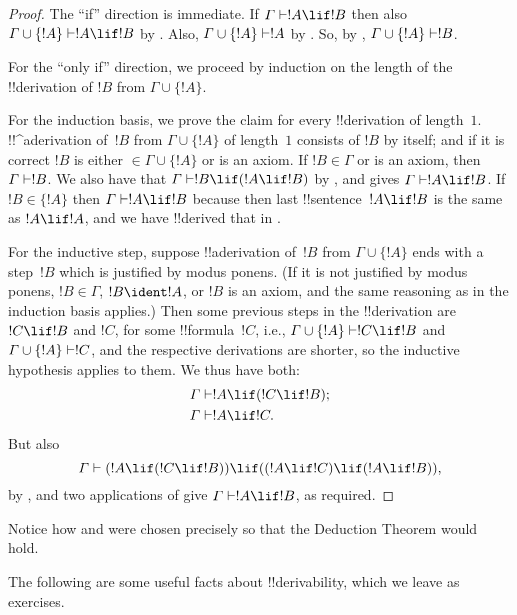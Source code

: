 \documentclass[../../../include/open-logic-section]{subfiles}
\begin{document}
\begin{proof}
The ``if'' direction is immediate.  If $\Gamma \Proves !A \lif !B$
then also $\Gamma \cup \{!A\} \Proves !A \lif !B$ by
.  Also, $\Gamma \cup \{!A\} \Proves !A$ by
. So, by , $\Gamma \cup
\{!A\} \Proves !B$.

For the ``only if'' direction, we proceed by induction on the length
of the !!{derivation} of $!B$ from $\Gamma \cup \{!A\}$.

For the induction basis, we prove the claim for every !!{derivation}
of length~$1$. !!^a{derivation} of~$!B$ from $\Gamma \cup \{!A\}$ of
length~$1$ consists of $!B$ by itself; and if it is correct $!B$ is
either $\in \Gamma \cup \{!A\}$ or is an axiom.  If $!B \in \Gamma$ or
is an axiom, then $\Gamma \Proves !B$. We also have that $\Gamma
\Proves !B \lif (!A \lif !B)$ by , and
 gives $\Gamma \Proves !A \lif !B$. If $!B \in \{ !A\}$
then $\Gamma \Proves !A \lif !B$ because then last !!{sentence}~$!A
\lif !B$ is the same as $!A \lif !A$, and we have !!{derive}d that in
.

For the inductive step, suppose !!a{derivation} of~$!B$ from
$\Gamma \cup \{!A\}$ ends with a step~$!B$ which is justified by modus
ponens. (If it is not justified by modus ponens, $!B \in \Gamma$, $!B
\ident !A$, or $!B$ is an axiom, and the same reasoning as in the
induction basis applies.) Then some previous steps in the
!!{derivation} are $!C \lif !B$ and $!C$, for some !!{formula}~$!C$,
i.e., $\Gamma \cup \{!A\} \Proves !C \lif !B$ and $\Gamma \cup \{!A\}
\Proves !C$, and the respective derivations are shorter, so the
inductive hypothesis applies to them. We thus have both:
\begin{align*}
  & \Gamma \Proves !A \lif (!C \lif !B); \\
  & \Gamma \Proves !A \lif !C.
\end{align*}
But also
\[
\Gamma \Proves (!A \lif (!C \lif !B)) \lif
((!A\lif !C)  \lif (!A \lif !B)),
\]
by , and two applications of  give
$\Gamma \Proves !A \lif !B$, as required.
\end{proof}

Notice how  and  were chosen
precisely so that the Deduction Theorem would hold.

The following are some useful facts about !!{derivability}, which we
leave as exercises.
\end{document}
